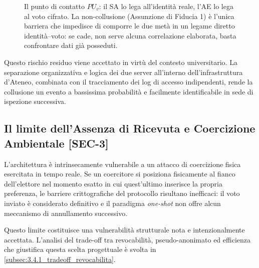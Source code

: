 \begin{figure}[H]
{%
    }
    \caption{Il punto di contatto $PU_v$: il SA lo lega all'identità reale, l'AE lo lega al voto cifrato. La non-collusione (Assunzione di Fiducia 1) è l'unica barriera che impedisce di comporre le due metà in un legame diretto identità--voto: se cade, non serve alcuna correlazione elaborata, basta confrontare dati già posseduti.}
    \label{fig:pivot_puv_collusione}
\end{figure}

Questo rischio residuo viene accettato in virtù del contesto universitario. La separazione organizzativa e logica dei due server all'interno dell'infrastruttura d'Ateneo, combinata con il tracciamento dei log di accesso indipendenti, rende la collusione un evento a bassissima probabilità e facilmente identificabile in sede di ispezione successiva.

\subsection{Il limite dell'Assenza di Ricevuta e Coercizione Ambientale [SEC-3]}
\label{subsec:3.3.6_vulnerabilita_coercizione}

L'architettura è intrinsecamente vulnerabile a un attacco di coercizione fisica esercitata in tempo reale. Se un coercitore si posiziona fisicamente al fianco dell'elettore nel momento esatto in cui quest'ultimo inserisce la propria preferenza, le barriere crittografiche del protocollo risultano inefficaci: il voto inviato è considerato definitivo e il paradigma \textit{one-shot} non offre alcun meccanismo di annullamento successivo.

Questo limite costituisce una vulnerabilità strutturale nota e intenzionalmente accettata. L'analisi del trade-off tra revocabilità, pseudo-anonimato ed efficienza che giustifica questa scelta progettuale è svolta in \ref{subsec:3.4.1_tradeoff_revocabilita}.

